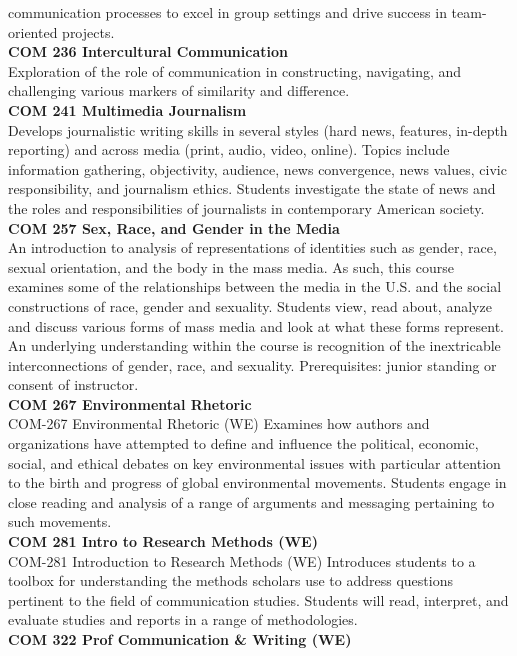 \documentclass[
  letterpaper,
]{scrbook}
\begin{document}
communication processes to excel in group settings and drive success in
team-oriented projects.\\
\textbf{COM 236 Intercultural Communication}\\
Exploration of the role of communication in constructing, navigating,
and challenging various markers of similarity and difference.\\
\textbf{COM 241 Multimedia Journalism}\\
Develops journalistic writing skills in several styles (hard news,
features, in-depth reporting) and across media (print, audio, video,
online). Topics include information gathering, objectivity, audience,
news convergence, news values, civic responsibility, and journalism
ethics. Students investigate the state of news and the roles and
responsibilities of journalists in contemporary American society.\\
\textbf{COM 257 Sex, Race, and Gender in the Media}\\
An introduction to analysis of representations of identities such as
gender, race, sexual orientation, and the body in the mass media. As
such, this course examines some of the relationships between the media
in the U.S. and the social constructions of race, gender and sexuality.
Students view, read about, analyze and discuss various forms of mass
media and look at what these forms represent. An underlying
understanding within the course is recognition of the inextricable
interconnections of gender, race, and sexuality. Prerequisites: junior
standing or consent of instructor.\\
\textbf{COM 267 Environmental Rhetoric}\\
COM-267 Environmental Rhetoric (WE) Examines how authors and
organizations have attempted to define and influence the political,
economic, social, and ethical debates on key environmental issues with
particular attention to the birth and progress of global environmental
movements. Students engage in close reading and analysis of a range of
arguments and messaging pertaining to such movements.\\
\textbf{COM 281 Intro to Research Methods (WE)}\\
COM-281 Introduction to Research Methods (WE) Introduces students to a
toolbox for understanding the methods scholars use to address questions
pertinent to the field of communication studies. Students will read,
interpret, and evaluate studies and reports in a range of
methodologies.\\
\textbf{COM 322 Prof Communication \& Writing (WE)}\\
\end{document}

